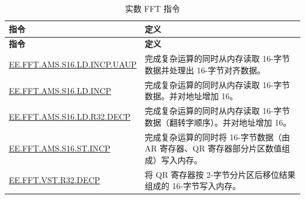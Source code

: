 \begin{longtable}[c]{|l|m{10cm}|}
    \caption{实数 FFT 指令}
    \label{tab:pie-real-fft-instructions}\\
    \hline
    \rowcolor{lightgray}
    \textbf{指令} & \textbf{定义} \\\hline
    \endfirsthead
    \rowcolor{lightgray}
    \textbf{指令} & \textbf{定义} \\\hline
    \endhead
    \endfoot
    
    \hyperref[instruction:EEFFTAMSS16LDINCPUAUP]{EE.FFT.AMS.S16.LD.INCP.UAUP} & 完成复杂运算的同时从内存读取 16-字节数据并处理出 16-字节对齐数据。
    \\\hline
    \hyperref[instruction:EEFFTAMSS16LDINCP]{EE.FFT.AMS.S16.LD.INCP} & 完成复杂运算的同时从内存读取 16-字节数据。并对地址增加 16。
    \\\hline
    \hyperref[instruction:EEFFTAMSS16LDR32DECP]{EE.FFT.AMS.S16.LD.R32.DECP} & 完成复杂运算的同时从内存读取 16-字节数据（翻转字顺序）。并对地址增加 16。
    \\\hline
    \hyperref[instruction:EEFFTAMSS16STINCP]{EE.FFT.AMS.S16.ST.INCP} & 完成复杂运算的同时将 16-字节数据（由 AR 寄存器、QR 寄存器部分片区数值组成）写入内存。
    \\\hline
    \hyperref[instruction:EEFFTVSTR32DECP]{EE.FFT.VST.R32.DECP} & 将 QR 寄存器按 2-字节分片区后移位结果组成的 16-字节写入内存。
    \\\hline
\end{longtable}